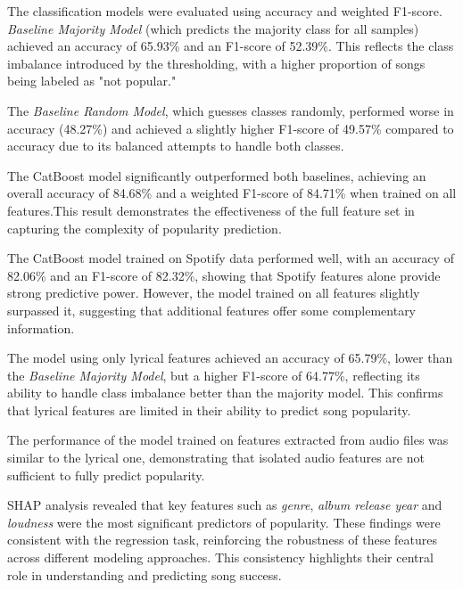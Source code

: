 The classification models were evaluated using accuracy and weighted F1-score.
\textit{Baseline Majority Model} (which predicts the majority class for all
samples) achieved an accuracy of 65.93\% and an F1-score of 52.39\%. This
reflects the class imbalance introduced by the thresholding, with a higher
proportion of songs being labeled as "not popular."

The \textit{Baseline Random Model}, which guesses classes randomly, performed
worse in accuracy (48.27\%) and achieved a slightly higher F1-score of 49.57\%
compared to accuracy due to its balanced attempts to handle both classes.

The CatBoost model significantly outperformed both baselines, achieving an
overall accuracy of 84.68\% and a weighted F1-score of 84.71\% when trained on
all features.This result demonstrates the effectiveness of the full feature set
in capturing the complexity of popularity prediction.


The CatBoost model trained on Spotify data performed well, with an accuracy of
82.06\% and an F1-score of 82.32\%, showing that Spotify features alone provide
strong predictive power. However, the model trained on all features slightly
surpassed it, suggesting that additional features offer some complementary
information.

The model using only lyrical features achieved an accuracy of 65.79\%, lower
than the \textit{Baseline Majority Model}, but a higher F1-score of 64.77\%,
reflecting its ability to handle class imbalance better than the majority
model. This confirms that lyrical features are limited in their ability to
predict song popularity.


The performance of the model trained on features extracted from audio files was
similar to the lyrical one, demonstrating that isolated audio features are not
sufficient to fully predict popularity.


SHAP analysis revealed that key features such as \textit{genre}, \textit{album
release year} and \textit{loudness} were the most
significant predictors of popularity. These findings were consistent with the
regression task, reinforcing the robustness of these features across different
modeling approaches. This consistency highlights their central role in
understanding and predicting song success.


